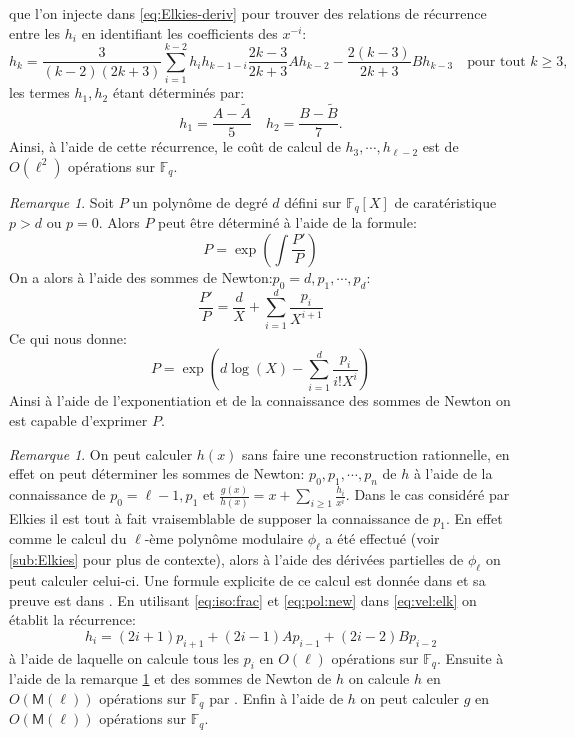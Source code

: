 \documentclass[10pt,a4paper]{book}
\theoremstyle{plain}
\theoremstyle{definition}
\theoremstyle{definition}
\theoremstyle{definition}
\theoremstyle{definition}
\theoremstyle{remark}
\newtheorem{rem}[thm]{Remarque}
\theoremstyle{remark}
\theoremstyle{definition}
\begin{document}
que l'on injecte dans \eqref{eq:Elkies-deriv} pour trouver des relations de récurrence entre les $h_i$ en identifiant les coefficients des $x^{-i}$:
\begin{equation}
\label{eq:rec:h_k}
h_k=\frac{3}{(k-2)(2k+3)}\sum_{i=1}^{k-2}h_ih_{k-1-i}\frac{2k-3}{2k+3}Ah_{k-2}-\frac{2(k-3)}{2k+3}Bh_{k-3} \quad \text{pour tout } k \geqslant 3,
\end{equation}
les termes $h_1,h_2$ étant déterminés par:
\begin{equation}
h_1=\frac{A-\tilde{A}}{5} \quad h_2={\frac{B-\tilde{B}}{7}}.
\end{equation}
Ainsi, à l'aide de cette récurrence, le coût de calcul de $h_3, \cdots , h_{\ell-2}$ est de $O(\ell^2)$ opérations sur $\mathbb{F}_q$. 

\begin{rem}
\label{rem:pol:rec}
Soit $P$ un polynôme de degré $d$ défini sur $\mathbb{F}_q[X]$ de caratéristique $p>d$ ou $p=0$. Alors $P$ peut être déterminé à l'aide de la formule:
\begin{equation}
P=\exp\left(\int{\frac{P'}{P}}\right)
\end{equation} 
On a alors à l'aide des sommes de Newton:$p_0=d,p_1, \cdots, p_d$:
\begin{equation}
\label{eq:pol:new}
\frac{P'}{P}= \frac{d}{X} + \sum_{i = 1}^d \frac{p_i}{X^{i+1}}
\end{equation}
Ce qui nous donne:
\begin{equation}
P=\exp\left( d \log(X) - \sum_{i = 1}^{d} \frac{p_i}{i!X^i} \right)
\end{equation} 
Ainsi à l'aide de l'exponentiation et de la connaissance des sommes de Newton on est capable d'exprimer $P$.
\end{rem}

\begin{rem}
\label{rem:ELK:h-p}
On peut calculer $h(x)$ sans faire une reconstruction rationnelle, en effet on peut déterminer les sommes de Newton: $p_0,p_1,\cdots, p_n$ de $h$ à l'aide de la connaissance de $p_0=\ell-1, p_1$ et $\frac{g(x)}{h(x)}=x+\sum_{i \geqslant 1}\frac{h_i}{x^i}$. Dans le cas considéré par Elkies il est tout à fait vraisemblable de supposer la connaissance de $p_1$. En effet comme le calcul du $\ell$-ème polynôme modulaire $\phi_{\ell}$ a été effectué (voir \ref{sub:Elkies} pour plus de contexte), alors à l'aide des dérivées partielles de $\phi_{\ell}$ on peut calculer celui-ci. Une formule explicite de ce calcul est donnée dans \cite[Theorem 17.22]{ehcc05} et sa preuve est dans \cite[§7]{Schoof95}. En utilisant \eqref{eq:iso:frac} et \eqref{eq:pol:new} dans \eqref{eq:vel:elk} on établit la récurrence:
\begin{equation}
\label{eq:p:rec}
h_i=(2i+1)p_{i+1}+(2i-1)Ap_{i-1}+(2i-2)Bp_{i-2}
\end{equation}
à l'aide de laquelle on calcule tous les $p_i$ en $O(\ell)$ opérations sur $\mathbb{F}_q$. Ensuite à l'aide de la remarque \ref{rem:pol:rec} et des sommes de Newton de $h$ on calcule $h$ en $O(\mathsf{M}(\ell))$ opérations sur $\mathbb{F}_q$ par \cite[§2.2]{BMSS08}.
Enfin à l'aide de $h$ on peut calculer $g$ en $O(\mathsf{M}(\ell))$ opérations sur $\mathbb{F}_q$.
\end{rem}
\end{document}
